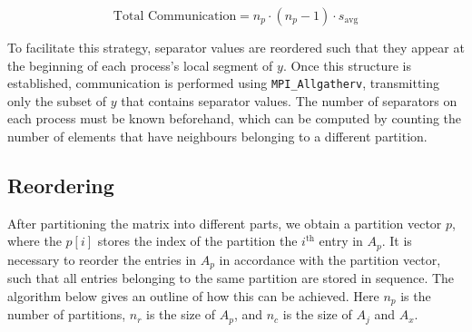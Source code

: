 \begin{equation}
    \label{eq:1bcomm}
    \text{Total Communication} = n_{p} \cdot (n_{p} - 1) \cdot s_{\text{avg}}
\end{equation}

To facilitate this strategy, separator values are reordered such that they appear at the beginning of each process's local segment of \(y\). Once this structure is established, communication is performed using \texttt{MPI\_Allgatherv}, transmitting only the subset of \(y\) that contains separator values. The number of separators on each process must be known beforehand, which can be computed by counting the number of elements that have neighbours belonging to a different partition.

\subsection{Reordering}
After partitioning the matrix into different parts, we obtain a partition vector \(p\), where the \(p[i]\) stores the index of the partition the \(i^{\text{th}}\) entry in \(A_{p}\). It is necessary to reorder the entries in \(A_{p}\) in accordance with the partition vector, such that all entries belonging to the same partition are stored in sequence. The algorithm below gives an outline of how this can be achieved. Here \(n_{p}\) is the number of partitions, \(n_{r}\) is the size of \(A_{p}\), and \(n_{c}\) is the size of \(A_{j}\) and \(A_{x}\).


